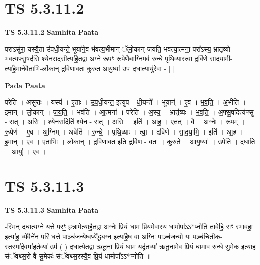 \documentclass[17pt]{extarticle}
\begin{document}

\section{ TS 5.3.11.2 }

\textbf{TS 5.3.11.2 } \newline
\textbf{Samhita Paata} \newline

पराऽसु॑रा॒ यस्यै॒ता उ॑पधी॒यन्ते॒ भूया॑ने॒व भ॑वत्य॒भीमान् ॅलो॒कान् ज॑यति॒ भव॑त्या॒त्मना॒ परा᳚ऽस्य॒ भ्रातृ॑व्यो भवत्यफ्सु॒षद॑सि श्येन॒सद॒सीत्या॑है॒तद्वा अ॒ग्ने रू॒पꣳ रू॒पेणै॒वाग्निमव॑ रुन्धे पृथि॒व्यास्त्वा॒ द्रवि॑णे सादया॒मी-त्या॑हे॒माने॒वैताभि॑-र्लो॒कान् द्रवि॑णावतः कुरुत आयु॒ष्या॑ उप॑ दधा॒त्यायु॑रे॒वा - [  ] \newline

\textbf{Pada Paata} \newline

परेति॑ । असु॑राः । यस्य॑ । ए॒ताः । उ॒प॒धी॒यन्त॒ इत्यु॑प - धी॒यन्ते᳚ । भूयान्॑ । ए॒व । भ॒व॒ति॒ । अ॒भीति॑ । इ॒मान् । लो॒कान् । ज॒य॒ति॒ । भव॑ति । आ॒त्मना᳚ । परेति॑ । अ॒स्य॒ । भ्रातृ॑व्यः । भ॒व॒ति॒ । अ॒फ्सु॒षदित्य॑फ्सु - सत् । अ॒सि॒ । श्ये॒न॒सदिति॑ श्येन - सत् । अ॒सि॒ । इति॑ । आ॒ह॒ । ए॒तत् । वै । अ॒ग्नेः । रू॒पम् । रू॒पेण॑ । ए॒व । अ॒ग्निम् । अवेति॑ । रु॒न्धे॒ । पृ॒थि॒व्याः । त्वा॒ । द्रवि॑णे । सा॒द॒या॒मि॒ । इति॑ । आ॒ह॒ । इ॒मान् । ए॒व । ए॒ताभिः॑ । लो॒कान् । द्रवि॑णावत॒ इति॒ द्रवि॑ण - व॒तः॒ । कु॒रु॒ते॒ । आ॒यु॒ष्याः᳚ । उपेति॑ । द॒धा॒ति॒ । आयुः॑ । ए॒व ।  \newline





\section{ TS 5.3.11.3 }

\textbf{TS 5.3.11.3 } \newline
\textbf{Samhita Paata} \newline

-स्मि॑न् दधा॒त्यग्ने॒ यत्ते॒ परꣳ॒॒ हृन्नामेत्या॑है॒तद्वा अ॒ग्नेः प्रि॒यं धाम॑ प्रि॒यमे॒वास्य॒ धामोपा᳚ऽऽ*प्नोति॒ तावेहि॒ सꣳ र॑भावहा॒ इत्या॑ह॒ व्ये॑वैने॑न॒ परि॑ धत्ते॒ पाञ्च॑जन्ये॒ष्वप्ये᳚द्ध्यग्न॒ इत्या॑है॒ष वा अ॒ग्निः पाञ्च॑जन्यो॒ यः पञ्च॑चितीक॒-स्तस्मा॑दे॒वमा॑हर्त॒व्या॑ उप॑ ( ) दधात्ये॒तद्वा ऋ॑तू॒नां प्रि॒यं धाम॒ यदृ॑त॒व्या॑ ऋतू॒नामे॒व प्रि॒यं धामाव॑ रुन्धे सु॒मेक॒ इत्या॑ह संॅवथ्स॒रो वै सु॒मेकः॑ संॅवथ्स॒रस्यै॒व प्रि॒यं धामोपा᳚ऽऽ*प्नोति ॥ \newline
\end{document}
